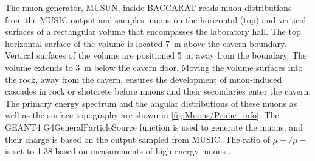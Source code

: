 The muon generator, MUSUN, inside BACCARAT reads muon distributions from the MUSIC output and samples muons on the horizontal (top) and vertical surfaces of a rectangular volume that encompasses the laboratory hall. The top horizontal surface of the volume is located 7~m above the cavern boundary. Vertical surfaces of the volume are positioned 5~m away from the boundary. The volume extends to 3~m below the cavern floor. Moving the volume surfaces into the rock, away from the cavern, ensures the development of muon-induced cascades in rock or shotcrete before muons and their secondaries enter the cavern. The primary energy spectrum and the angular distributions of these muons as well as the surface topography are shown in \autoref{fig:Muons/Prime_info}. The GEANT4 {\selectfont G4GeneralParticleSource} function is used to generate the muons, and their charge is based on the output sampled from MUSIC. The ratio of $\mu+/\mu-$ is set to 1.38 based on measurements of high energy muons \cite{Ashley:1975uj}.
